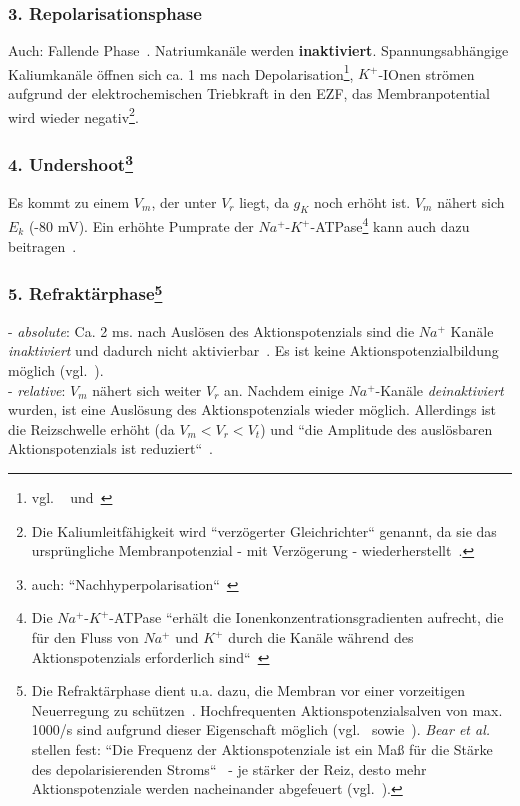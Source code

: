 \subsubsection*{3. Repolarisationsphase}
Auch: Fallende Phase~\cite[105]{BCP18}.
Natriumkanäle werden \textbf{inaktiviert}.
Spannungsabhängige Kaliumkanäle öffnen sich ca. 1 ms nach Depolarisation\footnote{
    vgl. ~\cite[105]{BCP18} und~\cite[47, Tafel 2.3 (A.2)]{SD07}
}, $K^+$-IOnen strömen aufgrund der elektrochemischen Triebkraft in den EZF, das Membranpotential wird wieder negativ\footnote{
    Die Kaliumleitfähigkeit wird ``verzögerter Gleichrichter`` genannt, da sie das ursprüngliche Membranpotenzial - mit Verzögerung - wiederherstellt~\cite[103]{BCP18}.
}.


\subsubsection*{4. Undershoot\footnote{
    auch: ``Nachhyperpolarisation``~\cite[46]{SD07}
}}
Es kommt zu einem $V_m$, der unter $V_r$ liegt, da $g_{K}$ noch erhöht ist. $V_m$ nähert sich $E_k$ (-80 mV). Ein erhöhte Pumprate der $Na^+$-$K^+$-ATPase\footnote{
    Die $Na^+$-$K^+$-ATPase ``erhält die Ionenkonzentrationsgradienten aufrecht, die für den Fluss von $Na^+$ und $K^+$ durch die Kanäle während des Aktionspotenzials erforderlich sind``~\cite[105]{BCP18}
} kann auch dazu beitragen~\cite[46]{SD07}.


\subsubsection*{5. Refraktärphase\footnote{
    Die Refraktärphase dient u.a. dazu, die Membran vor einer vorzeitigen Neuerregung zu schützen~\cite[76]{Jon19}.
    Hochfrequenten Aktionspotenzialsalven von max. 1000/s sind aufgrund dieser Eigenschaft möglich (vgl.~\cite[46]{SD07} sowie~\cite[89]{BCP18}).
    \textit{Bear et al.} stellen fest: ``Die Frequenz der Aktionspotenziale ist ein Maß für die Stärke des depolarisierenden Stroms``~\cite[89]{BCP18} - je stärker der Reiz, desto mehr Aktionspotenziale werden nacheinander abgefeuert (vgl.~\cite[90, Abb. 4.3]{BCP18}).
}}

- \textit{absolute}: Ca. 2 ms.
nach Auslösen des Aktionspotenzials sind die $Na^+$ Kanäle  \textit{inaktiviert} und dadurch nicht aktivierbar~\cite[70]{FE19}.
Es ist keine Aktionspotenzialbildung möglich (vgl.~\cite[46]{SD07}).\\
- \textit{relative}: $V_m$ nähert sich weiter $V_r$ an.
Nachdem einige $Na^+$-Kanäle  \textit{deinaktiviert} wurden, ist eine Auslösung des Aktionspotenzials wieder möglich.
Allerdings ist die Reizschwelle erhöht (da $V_m < V_r < V_t$) und ``die Amplitude des auslösbaren Aktionspotenzials ist reduziert``~\cite[70]{FE19}.


